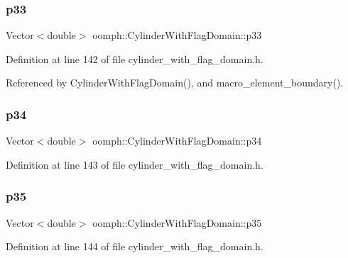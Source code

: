 \subsubsection{\texorpdfstring{p33}{p33}}
{\footnotesize\ttfamily Vector$<$double$>$ oomph\+::\+Cylinder\+With\+Flag\+Domain\+::p33\hspace{0.3cm}{\ttfamily [private]}}



Definition at line 142 of file cylinder\+\_\+with\+\_\+flag\+\_\+domain.\+h.



Referenced by Cylinder\+With\+Flag\+Domain(), and macro\+\_\+element\+\_\+boundary().

\mbox{\label{classoomph_1_1CylinderWithFlagDomain_a44aa94c4106c3f2d7c7575a50a56a98c}} 
\subsubsection{\texorpdfstring{p34}{p34}}
{\footnotesize\ttfamily Vector$<$double$>$ oomph\+::\+Cylinder\+With\+Flag\+Domain\+::p34\hspace{0.3cm}{\ttfamily [private]}}



Definition at line 143 of file cylinder\+\_\+with\+\_\+flag\+\_\+domain.\+h.

\mbox{\label{classoomph_1_1CylinderWithFlagDomain_afba63042c55f44d17628aaa0623e97b8}} 
\subsubsection{\texorpdfstring{p35}{p35}}
{\footnotesize\ttfamily Vector$<$double$>$ oomph\+::\+Cylinder\+With\+Flag\+Domain\+::p35\hspace{0.3cm}{\ttfamily [private]}}



Definition at line 144 of file cylinder\+\_\+with\+\_\+flag\+\_\+domain.\+h.




